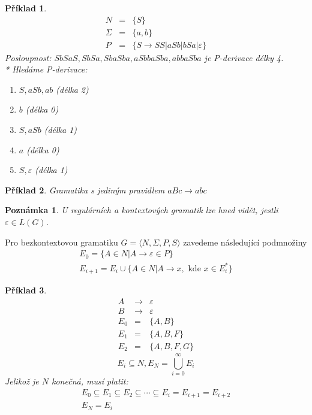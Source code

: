\documentclass[10pt, a4paper, titlepage]{article}
\theoremstyle{note}
\newtheorem{priklad}{\textbf{Příklad}}
\newtheorem{poznamka}{\textbf{Poznámka}}
\begin{document}
\begin{priklad}
\begin{eqnarray*}
N &=& \lbrace S \rbrace \\
\Sigma &=& \lbrace a, b \rbrace \\
P &=& \lbrace S \rightarrow SS|aSb|bSa| \varepsilon \rbrace
\end{eqnarray*}
Posloupnost: $SbSaS, SbSa, SbaSba, aSbbaSba , abbaSba$ je P-derivace délky 4. \\*
Hledáme P-derivace:
\begin{enumerate}
\item
$S, aSb, ab$ (délka 2)
\item
$b$ (délka 0)
\item
$S, aSb$ (délka 1)
\item
$a$ (délka 0)
\item
$S, \varepsilon $ (délka 1)
\end{enumerate}
\end{priklad}

\begin{priklad}
Gramatika s jediným pravidlem $aBc \rightarrow abc$
\end{priklad}

\begin{poznamka}
U regulárních a kontextových gramatik lze hned vidět, jestli $\varepsilon \in L(G)$.
\end{poznamka}

Pro bezkontextovou gramatiku $G = \langle N, \Sigma, P,S \rangle$ zavedeme následující podmnožiny
\begin{gather*}
E_{0} = \lbrace A \in N | A \rightarrow \varepsilon \in P \rbrace \\
E_{i+1} = E_{i} \cup \lbrace A \in N | A \rightarrow x, \text{ kde } x \in E_{i}^* \rbrace
\end{gather*}

\begin{priklad}
\begin{eqnarray*}
A &\rightarrow& \varepsilon \\
B &\rightarrow& \varepsilon \\
E_{0} &=& \lbrace A, B \rbrace \\
E_{1} &=& \lbrace A, B, F \rbrace \\
E_{2} &=& \lbrace A, B, F, G \rbrace
\end{eqnarray*}
$$
E_{i} \subseteq N, E_{N} = \bigcup_{i=0}^{\infty} E_{i}
$$
Jelikož je $N$ konečná, musí platit:
\begin{gather*}
E_{0} \subseteq E_{1} \subseteq E_{2} \subseteq \cdots \subseteq E_{i} = E_{i+1} = E_{i+2} \\
E_{N} = E_{i}
\end{gather*}
\end{priklad}
\end{document}
